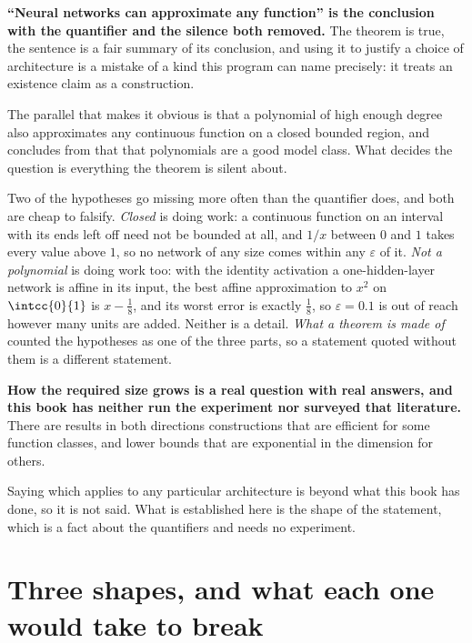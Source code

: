 \begin{fr}
\begin{trapbox}
\textbf{\enquote{Neural networks can approximate any function} is the
conclusion with the quantifier and the silence both removed.} The theorem is
true, the sentence is a fair summary of its conclusion, and using it to
justify a choice of architecture is a mistake of a kind this program can name
precisely: it treats an existence claim as a construction.

The parallel that makes it obvious is that a polynomial of high enough degree
also approximates any continuous function on a closed bounded region, and
concludes from that that polynomials are a good model class. What decides the
question is everything the theorem is silent about.
\end{trapbox}

Two of the hypotheses go missing more often than the quantifier does, and both
are cheap to falsify. \emph{Closed} is doing work: a continuous function on an
interval with its ends left off need not be bounded at all, and $1/x$ between
$0$ and $1$ takes every value above $1$, so no network of any size comes
within any $\varepsilon$ of it. \emph{Not a polynomial} is doing work too:
with the identity activation a one-hidden-layer network is affine in its
input, the best affine approximation to $x^{2}$ on $\intcc{0}{1}$ is
$x - \frac{1}{8}$, and its worst error is exactly $\frac{1}{8}$, so
$\varepsilon = \num{0.1}$ is out of reach however many units are added.
Neither is a detail. \emph{What a theorem is made of} counted the hypotheses
as one of the three parts, so a statement quoted without them is a different
statement.

\textbf{How the required size grows is a real question with real answers, and
this book has neither run the experiment nor surveyed that literature.} There
are results in both directions \dash{} constructions that are efficient for
some function classes, and lower bounds that are exponential in the dimension
for others.

Saying which applies to any particular architecture is beyond what this book
has done, so it is not said. What is established here is the shape of the
statement, which is a fact about the quantifiers and needs no experiment.
\end{fr}

\section{Three shapes, and what each one would take to break}
\label{sec:P14-shapes}

